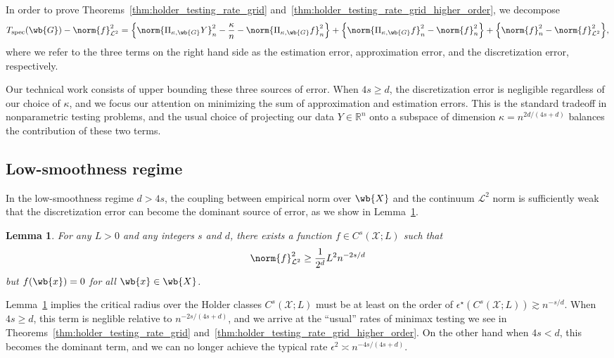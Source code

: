 \documentclass{article}
\newcommand{\Reals}{\mathbb{R}}
\newcommand{\1}{\mathbf{1}}
\newcommand{\Xset}{\mathcal{X}}
\newcommand{\Leb}{\mathcal{L}}
\newcommand{\spec}{\mathrm{spec}}
\theoremstyle{alden}
\theoremstyle{aldenthm}
\newtheorem{lemma}{Lemma}
\theoremstyle{definition}
\theoremstyle{remark}
\begin{document}
In order to prove Theorems~\ref{thm:holder_testing_rate_grid} and~\ref{thm:holder_testing_rate_grid_higher_order}, we decompose
\begin{equation*}
T_{\spec}(\wb{G}) - \norm{f}_{\Leb^2}^2 = \Bigl\{\norm{\Pi_{\kappa,\wb{G}}Y}_n^2 - \frac{\kappa}{n} - \norm{\Pi_{\kappa,\wb{G}}f}_n^2\Bigr\} + \Bigl\{\norm{\Pi_{\kappa,\wb{G}}f}_n^2 - \norm{f}_n^2\Bigr\} + \Bigl\{\norm{f}_n^2 - \norm{f}_{\Leb^2}^2\Bigr\},
\end{equation*}
where we refer to the three terms on the right hand side as the estimation error, approximation error, and the discretization error, respectively. 

Our technical work consists of upper bounding these three sources of error. When $4s \geq d$, the discretization error is negligible regardless of our choice of $\kappa$, and we focus our attention on minimizing the sum of approximation and estimation errors. This is the standard tradeoff in nonparametric testing problems, and the usual choice of projecting our data $Y \in \Reals^n$ onto a subspace of dimension $\kappa = n^{2d/(4s + d)}$ balances the contribution of these two terms. 

\subsection{Low-smoothness regime}
In the low-smoothness regime $d > 4s$, the coupling between empirical norm over $\wb{X}$ and the continuum $\Leb^2$ norm is sufficiently weak that the discretization error can become the dominant source of error, as we show in Lemma~\ref{lem:holder_testing_rate_grid_low_smoothness_lb}.

\begin{lemma}
	\label{lem:holder_testing_rate_grid_low_smoothness_lb}
	For any $L > 0$ and any integers $s$ and $d$, there exists a function $f \in C^s(\Xset;L)$ such that
	\begin{equation*}
	\norm{f}_{\Leb^2}^2 \geq \frac{1}{2^d} L^2 n^{-2s/d} 
	\end{equation*}
	but $f(\wb{x}) = 0$ for all $\wb{x} \in \wb{X}$. 
\end{lemma}
Lemma~\ref{lem:holder_testing_rate_grid_low_smoothness_lb} implies the critical radius over the Holder classes $C^s(\Xset;L)$ must be at least on the order of $\epsilon^{\star}(C^s(\Xset;L)) \gtrsim n^{-s/d}$. When $4s \geq d$, this term is neglible relative to $n^{-2s/(4s + d)}$, and we arrive at the ``usual'' rates of minimax testing we see in Theorems~\ref{thm:holder_testing_rate_grid} and~\ref{thm:holder_testing_rate_grid_higher_order}. On the other hand when $4s < d$, this becomes the dominant term, and we can no longer achieve the typical rate $\epsilon^2 \asymp n^{-4s/(4s + d)}$. 
\end{document}
